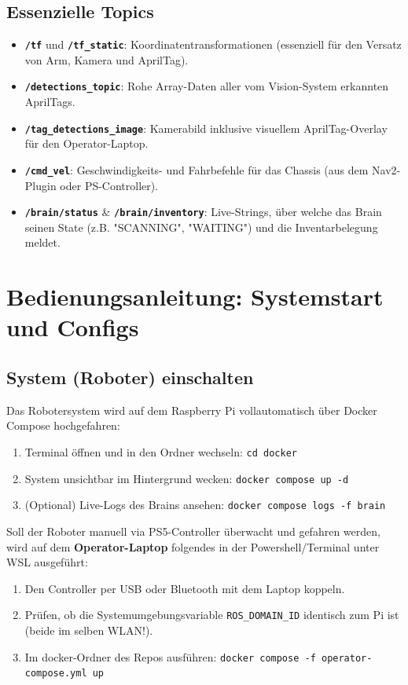 \documentclass[12pt,a4paper]{article}
\begin{document}
\subsection{Essenzielle Topics}
\begin{itemize}
    \item \textbf{\texttt{/tf}} und \textbf{\texttt{/tf\_static}}: Koordinatentransformationen (essenziell für den Versatz von Arm, Kamera und AprilTag).
    \item \textbf{\texttt{/detections\_topic}}: Rohe Array-Daten aller vom Vision-System erkannten AprilTags.
    \item \textbf{\texttt{/tag\_detections\_image}}: Kamerabild inklusive visuellem AprilTag-Overlay für den Operator-Laptop.
    \item \textbf{\texttt{/cmd\_vel}}: Geschwindigkeits- und Fahrbefehle für das Chassis (aus dem Nav2-Plugin oder PS-Controller).
    \item \textbf{\texttt{/brain/status}} \& \textbf{\texttt{/brain/inventory}}: Live-Strings, über welche das Brain seinen State (z.B. "SCANNING", "WAITING") und die Inventarbelegung meldet.
\end{itemize}

\section{Bedienungsanleitung: Systemstart und Configs}

\subsection{System (Roboter) einschalten}
Das Robotersystem wird auf dem Raspberry Pi vollautomatisch über Docker Compose hochgefahren:
\begin{enumerate}
    \item Terminal öffnen und in den Ordner wechseln: \texttt{cd docker}
    \item System unsichtbar im Hintergrund wecken: \texttt{docker compose up -d}
    \item (Optional) Live-Logs des Brains ansehen: \texttt{docker compose logs -f brain}
\end{enumerate}

Soll der Roboter manuell via PS5-Controller überwacht und gefahren werden, wird auf dem \textbf{Operator-Laptop} folgendes in der Powershell/Terminal unter WSL ausgeführt:
\begin{enumerate}
    \item Den Controller per USB oder Bluetooth mit dem Laptop koppeln.
    \item Prüfen, ob die Systemumgebungsvariable \texttt{ROS\_DOMAIN\_ID} identisch zum Pi ist (beide im selben WLAN!).
    \item Im docker-Ordner des Repos ausführen: \texttt{docker compose -f operator-compose.yml up}
\end{enumerate}
\end{document}
